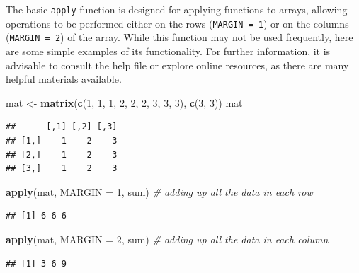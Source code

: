 \documentclass[
]{article}
\newenvironment{Shaded}{\begin{snugshade}}{\end{snugshade}}
\newcommand{\AttributeTok}[1]{\textcolor[rgb]{0.13,0.29,0.53}{#1}}
\newcommand{\CommentTok}[1]{\textcolor[rgb]{0.56,0.35,0.01}{\textit{#1}}}
\newcommand{\DecValTok}[1]{\textcolor[rgb]{0.00,0.00,0.81}{#1}}
\newcommand{\FunctionTok}[1]{\textcolor[rgb]{0.13,0.29,0.53}{\textbf{#1}}}
\newcommand{\NormalTok}[1]{#1}
\newcommand{\OtherTok}[1]{\textcolor[rgb]{0.56,0.35,0.01}{#1}}
\begin{document}
The basic \texttt{apply} function is designed for applying functions to arrays, allowing operations to be performed either on the rows (\texttt{MARGIN\ =\ 1}) or on the columns (\texttt{MARGIN\ =\ 2}) of the array. While this function may not be used frequently, here are some simple examples of its functionality. For further information, it is advisable to consult the help file or explore online resources, as there are many helpful materials available.

\begin{Shaded}
\begin{Highlighting}[]
\NormalTok{mat }\OtherTok{\textless{}{-}} \FunctionTok{matrix}\NormalTok{(}\FunctionTok{c}\NormalTok{(}\DecValTok{1}\NormalTok{, }\DecValTok{1}\NormalTok{, }\DecValTok{1}\NormalTok{, }\DecValTok{2}\NormalTok{, }\DecValTok{2}\NormalTok{, }\DecValTok{2}\NormalTok{, }\DecValTok{3}\NormalTok{, }\DecValTok{3}\NormalTok{, }\DecValTok{3}\NormalTok{), }\FunctionTok{c}\NormalTok{(}\DecValTok{3}\NormalTok{, }\DecValTok{3}\NormalTok{))}
\NormalTok{mat}
\end{Highlighting}
\end{Shaded}

\begin{verbatim}
##      [,1] [,2] [,3]
## [1,]    1    2    3
## [2,]    1    2    3
## [3,]    1    2    3
\end{verbatim}

\begin{Shaded}
\begin{Highlighting}[]
\FunctionTok{apply}\NormalTok{(mat, }\AttributeTok{MARGIN =} \DecValTok{1}\NormalTok{, sum) }\CommentTok{\# adding up all the data in each row}
\end{Highlighting}
\end{Shaded}

\begin{verbatim}
## [1] 6 6 6
\end{verbatim}

\begin{Shaded}
\begin{Highlighting}[]
\FunctionTok{apply}\NormalTok{(mat, }\AttributeTok{MARGIN =} \DecValTok{2}\NormalTok{, sum) }\CommentTok{\# adding up all the data in each column}
\end{Highlighting}
\end{Shaded}

\begin{verbatim}
## [1] 3 6 9
\end{verbatim}
\end{document}
